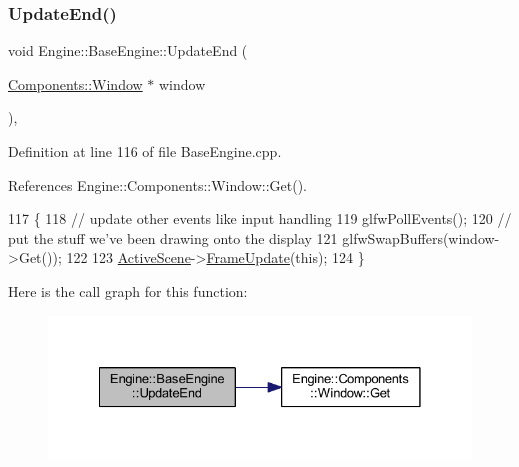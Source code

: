 \mbox{\label{classEngine_1_1BaseEngine_a7c07c98e583df042a0eb01e0ddec85a1}} 
\subsubsection{\texorpdfstring{Update\+End()}{UpdateEnd()}}
{\footnotesize\ttfamily void Engine\+::\+Base\+Engine\+::\+Update\+End (\begin{DoxyParamCaption}\item[{\mbox{\hyperlink{classEngine_1_1Components_1_1Window}{Components\+::\+Window}} $\ast$}]{window }\end{DoxyParamCaption})\hspace{0.3cm}{\ttfamily [virtual]}, {\ttfamily [inherited]}}



Definition at line 116 of file Base\+Engine.\+cpp.



References Engine\+::\+Components\+::\+Window\+::\+Get().


\begin{DoxyCode}
117 \{
118     \textcolor{comment}{// update other events like input handling}
119     glfwPollEvents();
120     \textcolor{comment}{// put the stuff we’ve been drawing onto the display}
121     glfwSwapBuffers(window->Get());
122 
123     \mbox{\hyperlink{classEngine_1_1BaseEngine_adb3dbc839da9d821e08b18d8a221698d}{ActiveScene}}->\mbox{\hyperlink{classEngine_1_1Components_1_1Scene_abd8fcdcac52dbce6a0a18de3860ab087}{FrameUpdate}}(\textcolor{keyword}{this});
124 \}
\end{DoxyCode}
Here is the call graph for this function\+:
\nopagebreak
\begin{figure}[H]
\begin{center}
\leavevmode
\includegraphics[width=328pt]{classEngine_1_1BaseEngine_a7c07c98e583df042a0eb01e0ddec85a1_cgraph}
\end{center}
\end{figure}


